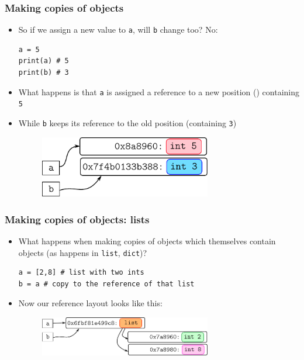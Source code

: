 \documentclass[xcolor=table]{beamer}
\begin{document}
\begin{frame}[fragile]
\frametitle{Making copies of objects}
    \begin{itemize} 
        \item So if we assign a new value to \texttt{a}, will \texttt{b} change too? No:
\begin{lstlisting}[style=python,belowskip=-0.8\baselineskip]
a = 5
print(a) # 5
print(b) # 3
\end{lstlisting} \pause
        \item What happens is that \texttt{a} is assigned a reference to a new position () containing \texttt{5}
        \item While \texttt{b} keeps its reference to the old position (containing \texttt{3}) \pause
            \begin{figure}\centering%
                \includegraphics[width = 75mm]{variable_assignment2.pdf}
            \end{figure}
    \end{itemize}
\end{frame}

\begin{frame}[fragile]
\frametitle{Making copies of objects: lists}
    \begin{itemize} 
        \item What happens when making copies of objects which themselves contain objects (as happens in \texttt{list}, \texttt{dict})?
\begin{lstlisting}[style=python,belowskip=-0.8\baselineskip]
a = [2,8] # list with two ints
b = a # copy to the reference of that list
\end{lstlisting} \pause
        \item Now our reference layout looks like this:
            \begin{figure}\centering%
                \includegraphics[width = 75mm]{variable_assignment3.pdf}
            \end{figure}
    \end{itemize}
\end{frame}
\end{document}
